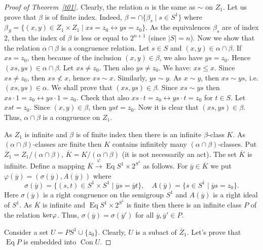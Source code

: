 \documentclass{birkau}
\numberwithin{equation}{section}
\theoremstyle{plain}
\theoremstyle{definition}
\DeclareMathOperator{\Con}{Con}
\DeclareMathOperator{\Eq}{Eq}
\begin{document}
\begin{proof}[Proof of Theorem~\ref{t01}]
		Clearly, the relation $\alpha$ is the same as $\sim$ on $Z_1$. Let us prove that $\beta$ is of finite index. Indeed, $\beta = \cap \{ \beta_s \mid s \in S^1 \}$ where $\beta_S = \{ (x, y) \in Z_1 \times Z_1 \mid xs = z_0 \leftrightarrow ys = z_0 \}$. As the equivalences $\beta_s$ are of index 2, then the index of $\beta$ is less or equal to $2^{n + 1}$ (since $|S| = n$). Now we show that the relation $\alpha \cap \beta$ is a congruence relation. Let $s \in S$ and $(x,y) \in \alpha \cap \beta$. If $xs = z_0$, then because of the inclusion $(x,y) \in \beta$, we also have $ys = z_0$. Hence $(xs,ys) \in \alpha \cap \beta$. Let $xs \neq z_0$. Then also $ ys \neq z_0 $. We have: $xs \leqslant x$. Since $xs \neq z_0$, then $xs \not < x$, hence $xs \sim x$. Similarly, $ys \sim y$. As $x \sim y$, then $ xs \sim ys$, i.e. $(xs,ys) \in \alpha$. We shall prove that $(xs,ys) \in \beta$. Since $xs \sim ys$ then $xs \cdot 1 = z_0 \leftrightarrow ys \cdot 1 = z_0$. Check that also $xs \cdot t = z_0 \leftrightarrow ys \cdot t = z_0$ for $t \in S$. Let $xst = z_0$. Since $(x,y) \in \beta$, then $yst = z_0$. Now it is clear that $(xs,ys) \in \beta$. Thus, $\alpha \cap \beta$ is a congruence on $Z_1$.
		
        As $Z_1$ is infinite and $\beta$ is of finite index then there is an infinite $\beta$-class $K$. As $(\alpha \cap \beta)$-classes are finite then $K$ contains infinitely many $(\alpha \cap \beta)$-classes. Put $\overline Z_1 = Z_1/(\alpha \cap \beta)$, $\overline K=K/(\alpha \cap \beta)$ (it is not necessarily an act). The set $\overline K$ is infinite. Define a mapping $\overline K \xrightarrow{\varphi}\Eq {S^1} \times 2^{S^1}$ as follows. For $\overline y \in \overline K$ we put $\varphi ( \overline y)=(\sigma(\overline y), A(\overline y))$ where $$ \sigma (\overline y) = \{ (s,t) \in S^1 \times S^1 \mid \overline y s=\overline y t\}, \quad A(\overline y) = \{ s\in S^1 \mid \overline y s =z_0 \}.$$ Here $ \sigma (\overline y)$ is a right congruence on the semigroup $S^1$ and $A(\overline y)$ is a right ideal of $S^1$. As $\overline K$ is infinite and $\Eq{S^1} \times 2^{S^1}$ is finite then there is an infinite class $P$ of the relation ${\rm ker}\varphi$. Thus, $\sigma (\overline y) =\sigma (\overline y')$ for all $\overline y, \overline y' \in P.$

        Consider a set $U=PS^1\cup\{z_0\}.$ Clearly, $U$ is a subact of $\overline Z_1.$ Let's prove that $\Eq P$ is embedded into $\Con U$.


\end{proof}
\end{document}
